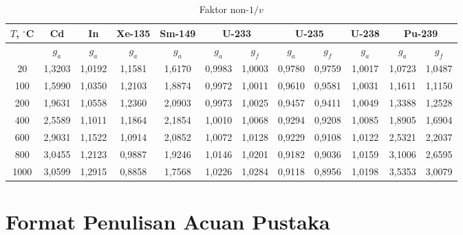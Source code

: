 \begin{table}
 \centering
 \caption{Faktor non-$1/v$}
  \begin{center}
\begin{tabular}{|c|c|c|c|c|c|c|c|c|c|c|c|}
\hline

$T$, $^\circ$C & Cd & In & Xe-135 & Sm-149 & \multicolumn{2}{|c|}{U-233} & \multicolumn{2}{|c|}{U-235}  & U-238 & \multicolumn{2}{|c|}{Pu-239} \\ 
\hline
     & $g_a$ & $g_a$& $g_a$ & $g_a$ & $g_a$ & $g_f$ & $g_a$ & $g_f$ & $g_a$  & $g_a$ & $g_f$ \\ 
20   & 1,3203 & 1,0192 & 1,1581 & 1,6170 & 0,9983 & 1,0003 & 0,9780 & 0,9759 & 1,0017 & 1,0723 & 1,0487  \\
100  & 1,5990 & 1,0350 & 1,2103 & 1,8874 & 0,9972 & 1,0011 & 0,9610 & 0,9581 & 1,0031 & 1,1611 & 1,1150  \\
200  & 1,9631 & 1,0558 & 1,2360 & 2,0903 & 0,9973 & 1,0025 & 0,9457 & 0,9411 & 1,0049 & 1,3388 & 1,2528 \\
400  & 2,5589 & 1,1011 & 1,1864 & 2,1854 & 1,0010 & 1,0068 & 0,9294 & 0,9208 & 1,0085 & 1,8905 & 1,6904 \\
600  & 2,9031 & 1,1522 & 1,0914 & 2,0852 & 1,0072 & 1,0128 & 0,9229 & 0,9108 & 1,0122 & 2,5321 & 2,2037 \\
800  & 3,0455 & 1,2123 & 0,9887 & 1,9246 & 1,0146 & 1,0201 & 0,9182 & 0,9036 & 1,0159 & 3,1006 & 2,6595 \\
1000 & 3,0599 & 1,2915 & 0,8858 & 1,7568 & 1,0226 & 1,0284 & 0,9118 & 0,8956 & 1,0198 & 3,5353 & 3,0079 \\
\hline
  \end{tabular}
  \end{center}

 \label{tbl: non-v}
\end{table}


\section{Format Penulisan Acuan Pustaka}

